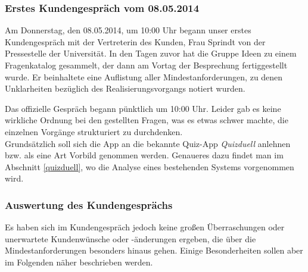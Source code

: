\documentclass[fontsize=12pt,paper=a4,twoside]{scrartcl}
\begin{document}
\subsubsection{Erstes Kundengespräch vom 08.05.2014}

Am Donnerstag, den 08.05.2014, um 10:00 Uhr begann unser erstes Kundengespräch mit der Vertreterin des Kunden, Frau Sprindt von der Pressestelle der Universität. In den Tagen zuvor hat die Gruppe Ideen zu einem Fragenkatalog gesammelt, der dann am Vortag der Besprechung fertiggestellt wurde. Er beinhaltete eine Auflistung aller Mindestanforderungen, zu denen Unklarheiten bezüglich des Realisierungsvorgangs notiert wurden. 

Das offizielle Gespräch begann pünktlich um 10:00 Uhr. Leider gab es keine wirkliche Ordnung bei den gestellten Fragen, was es etwas schwer machte, die einzelnen Vorgänge strukturiert zu durchdenken.\\
Grundsätzlich soll sich die App an die bekannte Quiz-App \textit{Quizduell} anlehnen bzw. als eine Art Vorbild genommen werden. Genaueres dazu findet man im Abschnitt \ref{quizduell}, wo die Analyse eines bestehenden Systems vorgenommen wird.

\subsubsection{Auswertung des Kundengesprächs}

Es haben sich im Kundengespräch jedoch keine großen Überraschungen oder unerwartete Kundenwünsche oder -änderungen ergeben, die über die Mindestanforderungen besonders hinaus gehen. Einige Besonderheiten sollen aber im Folgenden näher beschrieben werden.\\
\end{document}
